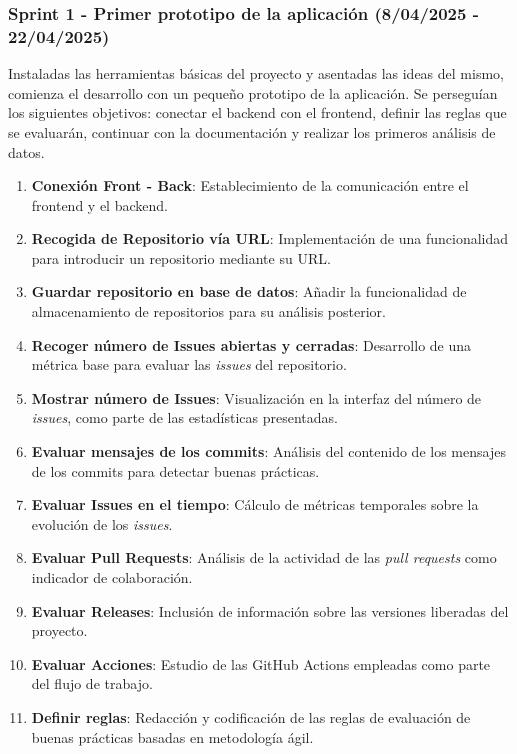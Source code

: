 \subsubsection{Sprint 1 - Primer prototipo de la aplicación (8/04/2025 - 22/04/2025)}

Instaladas las herramientas básicas del proyecto y asentadas las ideas del mismo, comienza el desarrollo con un pequeño prototipo de la aplicación. Se perseguían los siguientes objetivos: conectar el backend con el frontend, definir las reglas que se evaluarán, continuar con la documentación y realizar los primeros análisis de datos.

\begin{enumerate}
\item \textbf{Conexión Front - Back}: Establecimiento de la comunicación entre el frontend y el backend.
\item \textbf{Recogida de Repositorio vía URL}: Implementación de una funcionalidad para introducir un repositorio mediante su URL.
\item \textbf{Guardar repositorio en base de datos}: Añadir la funcionalidad de almacenamiento de repositorios para su análisis posterior.
\item \textbf{Recoger número de Issues abiertas y cerradas}: Desarrollo de una métrica base para evaluar las \textit{issues} del repositorio.
\item \textbf{Mostrar número de Issues}: Visualización en la interfaz del número de \textit{issues}, como parte de las estadísticas presentadas.
\item \textbf{Evaluar mensajes de los commits}: Análisis del contenido de los mensajes de los commits para detectar buenas prácticas.
\item \textbf{Evaluar Issues en el tiempo}: Cálculo de métricas temporales sobre la evolución de los \textit{issues}.
\item \textbf{Evaluar Pull Requests}: Análisis de la actividad de las \textit{pull requests} como indicador de colaboración.
\item \textbf{Evaluar Releases}: Inclusión de información sobre las versiones liberadas del proyecto.
\item \textbf{Evaluar Acciones}: Estudio de las GitHub Actions empleadas como parte del flujo de trabajo.
\item \textbf{Definir reglas}: Redacción y codificación de las reglas de evaluación de buenas prácticas basadas en metodología ágil.
\end{enumerate}

